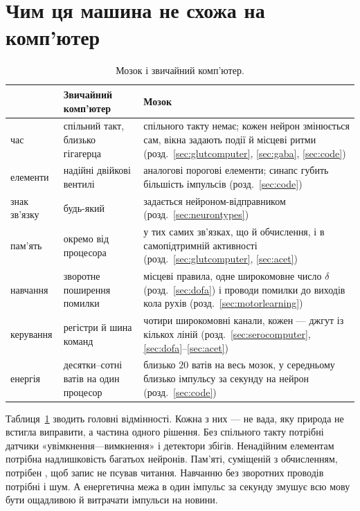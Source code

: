 \section{Чим ця машина не схожа на комп'ютер}

\begin{table}[t]
\centering
\footnotesize
\setlength{\tabcolsep}{4pt}
\renewcommand{\arraystretch}{1.15}
\begin{tabular}{>{\raggedright}p{2.2cm}>{\raggedright}p{4.2cm}>{\raggedright\arraybackslash}p{6.6cm}}
\toprule
& Звичайний комп'ютер & Мозок \\
\midrule
час & спільний такт, близько гігагерца & спільного такту немає; кожен нейрон змінюється сам, вікна задають події й місцеві ритми (розд.~\ref{sec:glutcomputer}, \ref{sec:gaba}, \ref{sec:code}) \\
елементи & надійні двійкові вентилі & аналогові порогові елементи; синапс губить більшість імпульсів (розд.~\ref{sec:code}) \\
знак зв'язку & будь-який & задається нейроном-відправником (розд.~\ref{sec:neurontypes}) \\
пам'ять & окремо від процесора & у тих самих зв'язках, що й обчислення, і в самопідтримній активності (розд.~\ref{sec:glutcomputer}, \ref{sec:acet}) \\
навчання & зворотне поширення помилки & місцеві правила, одне широкомовне число $\delta$ (розд.~\ref{sec:dofa}) і проводи помилки до виходів кола рухів (розд.~\ref{sec:motorlearning}) \\
керування & регістри й шина команд & чотири широкомовні канали, кожен --- джгут із кількох ліній (розд.~\ref{sec:serocomputer}, \ref{sec:dofa}--\ref{sec:acet}) \\
енергія & десятки--сотні ватів на один процесор & близько $20$ ватів на весь мозок, у середньому близько імпульсу за секунду на нейрон (розд.~\ref{sec:code}) \\
\bottomrule
\end{tabular}
\caption{Мозок і звичайний комп'ютер.}
\label{tab:computer}
\end{table}

Таблиця~\ref{tab:computer} зводить головні відмінності. Кожна з них --- не вада, яку природа не встигла виправити, а частина одного рішення. Без спільного такту потрібні датчики «увімкнення---вимкнення» і детектори збігів. Ненадійним елементам потрібна надлишковість багатьох нейронів. Пам'яті, суміщеній з обчисленням, потрібен , щоб запис не псував читання. Навчанню без зворотних проводів потрібні  і шум. А енергетична межа в один імпульс за секунду змушує всю мову бути ощадливою й витрачати імпульси на новини.

